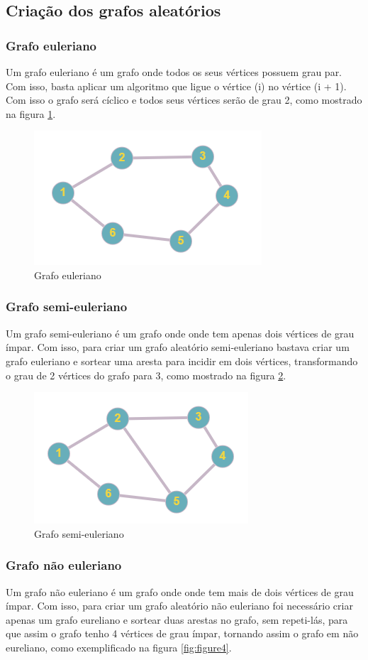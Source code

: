 \subsection{\esp Criação dos grafos aleatórios}
\subsubsection{\esp Grafo euleriano}
Um grafo euleriano é um grafo onde todos os seus vértices possuem grau par. Com isso, basta aplicar um algoritmo que ligue o vértice (i) no vértice (i + 1). Com isso o grafo será cíclico e todos seus vértices serão de grau 2, como mostrado na figura \ref{fig:figure2}.

\begin{figure}[ht]
    \centering
    \includegraphics[width=.2\textwidth]{figuras/eureliano.png}
    \caption{Grafo euleriano}
    \label{fig:figure2}
\end{figure}

\subsubsection{\esp Grafo semi-euleriano}
Um grafo semi-euleriano é um grafo onde onde tem apenas dois vértices de grau ímpar. Com isso, para criar um grafo aleatório semi-euleriano bastava criar um grafo euleriano e sortear uma aresta para incidir em dois vértices, transformando o grau de 2 vértices do grafo para 3, como mostrado na figura \ref{fig:figure3}.

\begin{figure}[ht]
    \centering
    \includegraphics[width=.2\textwidth]{figuras/semi-eureliano.png}
    \caption{Grafo semi-euleriano}
    \label{fig:figure3}
\end{figure}

\subsubsection{\esp Grafo não euleriano}
Um grafo não euleriano é um grafo onde onde tem mais de dois vértices de grau ímpar. Com isso, para criar um grafo aleatório não euleriano foi necessário criar apenas um grafo eureliano e sortear duas arestas no grafo, sem repeti-lás, para que assim o grafo tenho 4 vértices de grau ímpar, tornando assim o grafo em não eureliano, como exemplificado na figura \ref{fig:figure4}.

